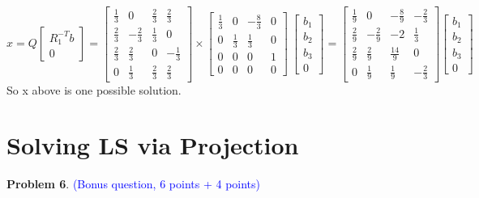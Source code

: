 \documentclass[english,onecolumn]{IEEEtran}
\begin{document}
\begin{enumerate}
$$
x=
Q\left[\begin{array}{c}
	R_{1}^{-T} b \\
	0
\end{array}\right]=
\begin{bmatrix}
	\frac{1}{3}&0&\frac{2}{3}&\frac{2}{3}\\
	\frac{2}{3}&-\frac{2}{3}&\frac{1}{3}&0\\
	\frac{2}{3}&\frac{2}{3}&0&-\frac{1}{3}\\
	0&\frac{1}{3}&\frac{2}{3}&\frac{2}{3}
\end{bmatrix} \times
\begin{bmatrix}
	\frac{1}{3}&0&-\frac{8}{3}&0\\
	0&\frac{1}{3}&\frac{1}{3}&0\\
	0&0&0&1\\
	0&0&0&0
\end{bmatrix}\
\begin{bmatrix}
	b_1\\
	b_2\\
	b_3\\
	0
\end{bmatrix}=
\begin{bmatrix}
	\frac{1}{9}&0&-\frac{8}{9}&-\frac{2}{3}\\
	\frac{2}{9}&-\frac{2}{9}&-2&\frac{1}{3}\\
	\frac{2}{9}&\frac{2}{9}&\frac{14}{9}&0\\
	0&\frac{1}{9}&\frac{1}{9}&-\frac{2}{3}
\end{bmatrix}
\begin{bmatrix}
	b_1\\
	b_2\\
	b_3\\
	0
\end{bmatrix}\
$$
So x above is one possible solution.
\end{enumerate}

\newpage
\section{Solving LS via Projection}
\noindent\textbf{Problem 6}. \textcolor{blue}{(Bonus question, 6 points + 4 points)}
\end{document}
